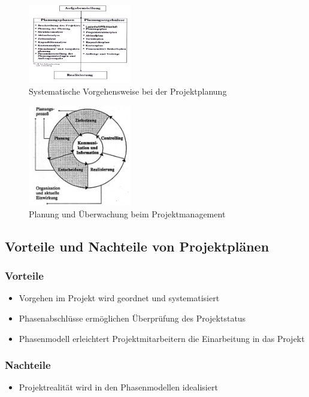 \documentclass[11pt,a4paper]{article}
\begin{document}
\begin{figure}[H]
	\centering

	\includegraphics[width=0.4\textwidth]{ch8/projektplanung}
	\caption*{Systematische Vorgehensweise bei der Projektplanung}
\end{figure}
\begin{figure}[H]
	\centering

	\includegraphics[width=0.4\textwidth]{ch8/managementkreis}
	\caption*{Planung und Überwachung beim Projektmanagement}
\end{figure}

\subsection{Vorteile und Nachteile von Projektplänen}
\subsubsection{Vorteile}
\begin{itemize}
\item Vorgehen im Projekt wird geordnet und systematisiert
\item Phasenabschlüsse ermöglichen Überprüfung des Projektstatus
\item Phasenmodell erleichtert Projektmitarbeitern die Einarbeitung in das
Projekt
\end{itemize}
\subsubsection{Nachteile}
\begin{itemize}
\item Projektrealität wird in den Phasenmodellen idealisiert
\end{itemize}
\end{document}
